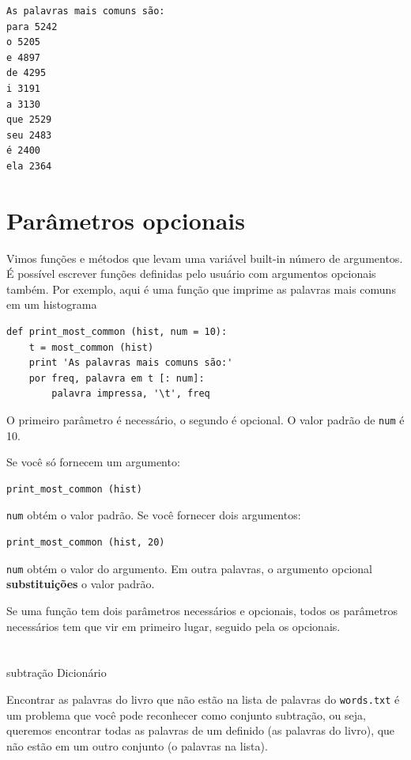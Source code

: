 \documentclass[10pt]{book}
\begin{document}
\begin{v erbatim}
\begin{verbatim}
As palavras mais comuns são:
para 5242
o 5205
e 4897
de 4295
i 3191
a 3130
que 2529
seu 2483
é 2400
ela 2364
\end{verbatim}
%

\section{Parâmetros opcionais}

Vimos funções e métodos que levam uma variável built-in
número de argumentos. É possível escrever funções definidas pelo usuário
com argumentos opcionais também. Por exemplo, aqui é uma função que
imprime as palavras mais comuns em um histograma

\begin{verbatim}
def print_most_common (hist, num = 10):
    t = most_common (hist)
    print 'As palavras mais comuns são:'
    por freq, palavra em t [: num]:
        palavra impressa, '\t', freq
\end{verbatim}

O primeiro parâmetro é necessário, o segundo é opcional.
O valor padrão {\bf} de {\tt num} é 10.

Se você só fornecem um argumento:

\begin{verbatim}
print_most_common (hist)
\end{verbatim}

{\tt num} obtém o valor padrão. Se você fornecer dois argumentos:

\begin{verbatim}
print_most_common (hist, 20)
\end{verbatim}

{\tt num} obtém o valor do argumento. Em outra
palavras, o argumento opcional {\bf substituições} o valor padrão.

Se uma função tem dois parâmetros necessários e opcionais, todos
os parâmetros necessários tem que vir em primeiro lugar, seguido pela
os opcionais.


\section{} subtração Dicionário

Encontrar as palavras do livro que não estão na lista de palavras
do {\tt words.txt} é um problema que você pode reconhecer como conjunto
subtração, ou seja, queremos encontrar todas as palavras de um
definido (as palavras do livro), que não estão em um outro conjunto (o
palavras na lista).


\end{v erbatim}
\end{document}
